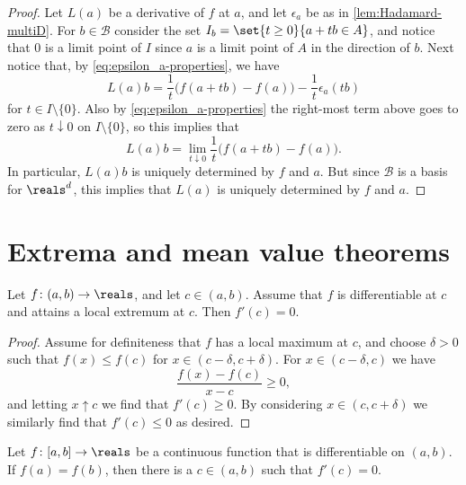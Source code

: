 \documentclass[article, a4paper, 11pt, oneside]{memoir}
\numberwithin{equation}{chapter}
\newcommand{\calB}{\mathcal{B}}
\begin{document}
\begin{proof}
    Let $L(a)$ be a derivative of $f$ at $a$, and let $\epsilon_a$ be as in \cref{lem:Hadamard-multiD}. For $b \in \calB$ consider the set $I_b = \set{t \geq 0}{a+tb \in A}$, and notice that $0$ is a limit point of $I$ since $a$ is a limit point of $A$ in the direction of $b$. Next notice that, by \cref{eq:epsilon_a-properties}, we have
    \begin{equation*}
        L(a)b
            = \frac{1}{t} \bigl( f(a + tb) - f(a) \bigr) - \frac{1}{t} \epsilon_a(tb)
    \end{equation*}
    for $t \in I \setminus \{0\}$. Also by \cref{eq:epsilon_a-properties} the right-most term above goes to zero as $t \downarrow 0$ on $I \setminus \{0\}$, so this implies that
    \begin{equation*}
        L(a)b
            = \lim_{t \downarrow 0} \frac{1}{t} \bigl( f(a + tb) - f(a) \bigr).
    \end{equation*}
    In particular, $L(a)b$ is uniquely determined by $f$ and $a$. But since $\calB$ is a basis for $\reals^d$, this implies that $L(a)$ is uniquely determined by $f$ and $a$.
\end{proof}


\section{Extrema and mean value theorems}

\begin{proposition}
    \label{prop:local-extrema-stationary}
    Let $f \colon (a,b) \to \reals$, and let $c \in (a,b)$. Assume that $f$ is differentiable at $c$ and attains a local extremum at $c$. Then $f'(c) = 0$.
\end{proposition}

\begin{proof}
    Assume for definiteness that $f$ has a local maximum at $c$, and choose $\delta > 0$ such that $f(x) \leq f(c)$ for $x \in (c - \delta, c + \delta)$. For $x \in (c - \delta, c)$ we have
    \begin{equation*}
        \frac{f(x) - f(c)}{x - c} \geq 0,
    \end{equation*}
    and letting $x \uparrow c$ we find that $f'(c) \geq 0$. By considering $x \in (c, c + \delta)$ we similarly find that $f'(c) \leq 0$ as desired.
\end{proof}


\begin{lemma}
    \label{lem:Rolle}
    Let $f \colon [a,b] \to \reals$ be a continuous function that is differentiable on $(a,b)$. If $f(a) = f(b)$, then there is a $c \in (a,b)$ such that $f'(c) = 0$.
\end{lemma}
\end{document}
